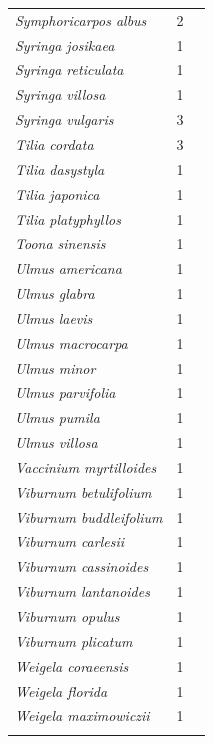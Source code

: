 \documentclass[11pt]{article}
\begin{document}
\begin{longtable}{p{}p{}p{}}
  \emph{Symphoricarpos albus} &   2 & \emph{\citep{Laube:2014a,Laube:2014b}} \\ 
  \emph{Syringa josikaea} &   1 & \emph{\citep{zohner2016}} \\ 
  \emph{Syringa reticulata} &   1 & \emph{\citep{zohner2016}} \\ 
  \emph{Syringa villosa} &   1 & \emph{\citep{zohner2016}} \\ 
  \emph{Syringa vulgaris} &   3 & \emph{\citep{Basler:2012,Laube:2014a,Laube:2014b}} \\ 
  \emph{Tilia cordata} &   3 & \emph{\citep{Basler:2012,Caffarra:2011a,malyshev2018}} \\ 
  \emph{Tilia dasystyla} &   1 & \emph{\citep{zohner2016}} \\ 
  \emph{Tilia japonica} &   1 & \emph{\citep{zohner2016}} \\ 
  \emph{Tilia platyphyllos} &   1 & \emph{\citep{zohner2016}} \\ 
  \emph{Toona sinensis} &   1 & \emph{\citep{zohner2016}} \\ 
  \emph{Ulmus americana} &   1 & \emph{\citep{zohner2016}} \\ 
  \emph{Ulmus glabra} &   1 & \emph{\citep{Ghelardini:2010aa}} \\ 
  \emph{Ulmus laevis} &   1 & \emph{\citep{zohner2016}} \\ 
  \emph{Ulmus macrocarpa} &   1 & \emph{\citep{Ghelardini:2010aa}} \\ 
  \emph{Ulmus minor} &   1 & \emph{\citep{Ghelardini:2010aa}} \\ 
  \emph{Ulmus parvifolia} &   1 & \emph{\citep{Ghelardini:2010aa}} \\ 
  \emph{Ulmus pumila} &   1 & \emph{\citep{Ghelardini:2010aa}} \\ 
  \emph{Ulmus villosa} &   1 & \emph{\citep{Ghelardini:2010aa}} \\ 
  \emph{Vaccinium myrtilloides} &   1 & \emph{\citep{flynn2018}} \\ 
  \emph{Viburnum betulifolium} &   1 & \emph{\citep{zohner2016}} \\ 
  \emph{Viburnum buddleifolium} &   1 & \emph{\citep{zohner2016}} \\ 
  \emph{Viburnum carlesii} &   1 & \emph{\citep{zohner2016}} \\ 
  \emph{Viburnum cassinoides} &   1 & \emph{\citep{flynn2018}} \\ 
  \emph{Viburnum lantanoides} &   1 & \emph{\citep{flynn2018}} \\ 
  \emph{Viburnum opulus} &   1 & \emph{\citep{zohner2016}} \\ 
  \emph{Viburnum plicatum} &   1 & \emph{\citep{zohner2016}} \\ 
  \emph{Weigela coraeensis} &   1 & \emph{\citep{zohner2016}} \\ 
  \emph{Weigela florida} &   1 & \emph{\citep{zohner2016}} \\ 
  \emph{Weigela maximowiczii} &   1 & \emph{\citep{zohner2016}} \\ 
  \hline
\label{tab:ref}
\end{longtable}
\endgroup
\end{document}
